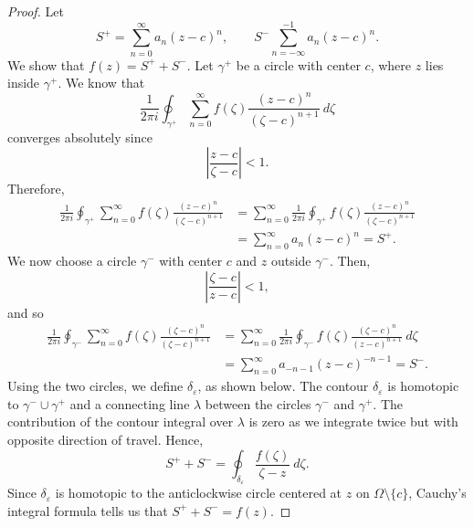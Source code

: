 \documentclass[a4paper, openany]{memoir}
\theoremstyle{definition}
\theoremstyle{plain}
\begin{document}
\begin{proof}
Let
\[S^+ = \sum_{n=0}^\infty a_n (z - c)^n, \qquad S^- \sum_{n=-\infty}^{-1} a_n (z - c)^n.\]
We show that $f(z) = S^+ + S^-$. Let $\gamma^+$ be a circle with center $c$, where $z$ lies inside $\gamma^+$. We know that
\[\frac{1}{2\pi i} \oint_{\gamma^+} \sum_{n=0}^\infty f(\zeta) \frac{(z- c)^n}{(\zeta - c)^{n+1}} \ d\zeta\]
converges absolutely since
\[\left|\frac{z - c}{\zeta - c}\right| < 1.\]
Therefore,
\begin{align*}
    \frac{1}{2\pi i} \oint_{\gamma^+} \sum_{n=0}^\infty f(\zeta) \frac{(z - c)^n}{(\zeta - c)^{n+1}} &= \sum_{n=0}^\infty \frac{1}{2\pi i} \oint_{\gamma^+} f(\zeta) \frac{(z - c)^n}{(\zeta - c)^{n+1}} \\
    &= \sum_{n=0}^\infty a_n (z - c)^n = S^+.
\end{align*}
We now choose a circle $\gamma^-$ with center $c$ and $z$ outside $\gamma^-$. Then,
\[\left|\frac{\zeta - c}{z - c}\right| < 1,\]
and so
\begin{align*}
    \frac{1}{2\pi i} \oint_{\gamma^-} \sum_{n=0}^\infty f(\zeta) \frac{(\zeta - c)^n}{(\zeta - c)^{n+1}} &= \sum_{n=0}^\infty \frac{1}{2\pi i} \oint_{\gamma^-} f(\zeta) \frac{(\zeta - c)^n}{(z - c)^{n+1}} \ d\zeta \\
    &= \sum_{n=0}^\infty a_{-n-1}(z - c)^{-n-1} = S^-.
\end{align*}
Using the two circles, we define $\delta_\varepsilon$, as shown below.
The contour $\delta_\varepsilon$ is homotopic to $\gamma^- \cup \gamma^+$ and a connecting line $\lambda$ between the circles $\gamma^-$ and $\gamma^+$. The contribution of the contour integral over $\lambda$ is zero as we integrate twice but with opposite direction of travel. Hence,
\[S^+ + S^- = \oint_{\delta_\varepsilon} \frac{f(\zeta)}{\zeta - z} \ d\zeta.\]
Since $\delta_\varepsilon$ is homotopic to the anticlockwise circle centered at $z$ on $\Omega \setminus \{c\}$, Cauchy's integral formula tells us that $S^+ + S^- = f(z)$.
\end{proof}
\end{document}
